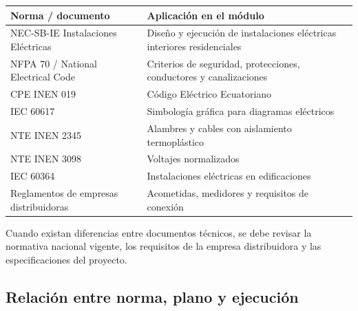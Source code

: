\documentclass[
  spanish,
  letterpaper,
  DIV=11,
  numbers=noendperiod]{scrreprt}
\newcounter{none} %
\begin{document}
{\def\LTcaptype{none} %
\begin{longtable}[]{@{}
  >{\raggedright\arraybackslash}p{}
  >{\raggedright\arraybackslash}p{}@{}}
\toprule\noalign{}
\begin{minipage}[b]{\linewidth}\raggedright
Norma / documento
\end{minipage} & \begin{minipage}[b]{\linewidth}\raggedright
Aplicación en el módulo
\end{minipage} \\
\midrule\noalign{}
\endhead
\bottomrule\noalign{}
\endlastfoot
NEC-SB-IE Instalaciones Eléctricas & Diseño y ejecución de instalaciones
eléctricas interiores residenciales \\
NFPA 70 / National Electrical Code & Criterios de seguridad,
protecciones, conductores y canalizaciones \\
CPE INEN 019 & Código Eléctrico Ecuatoriano \\
IEC 60617 & Simbología gráfica para diagramas eléctricos \\
NTE INEN 2345 & Alambres y cables con aislamiento termoplástico \\
NTE INEN 3098 & Voltajes normalizados \\
IEC 60364 & Instalaciones eléctricas en edificaciones \\
Reglamentos de empresas distribuidoras & Acometidas, medidores y
requisitos de conexión \\
\end{longtable}
}

\begin{tcolorbox}[enhanced jigsaw, arc=.35mm, bottomrule=.15mm, bottomtitle=1mm, breakable, colback=white, colbacktitle=quarto-callout-note-color!10!white, colframe=quarto-callout-note-color-frame, coltitle=black, left=2mm, leftrule=.75mm, opacityback=0, opacitybacktitle=0.6, rightrule=.15mm, title=\textcolor{quarto-callout-note-color}{\faInfo}\hspace{0.5em}{Nota}, titlerule=0mm, toprule=.15mm, toptitle=1mm]

Cuando existan diferencias entre documentos técnicos, se debe revisar la
normativa nacional vigente, los requisitos de la empresa distribuidora y
las especificaciones del proyecto.

\end{tcolorbox}

\subsection{Relación entre norma, plano y
ejecución}\label{relaciuxf3n-entre-norma-plano-y-ejecuciuxf3n}
\end{document}
